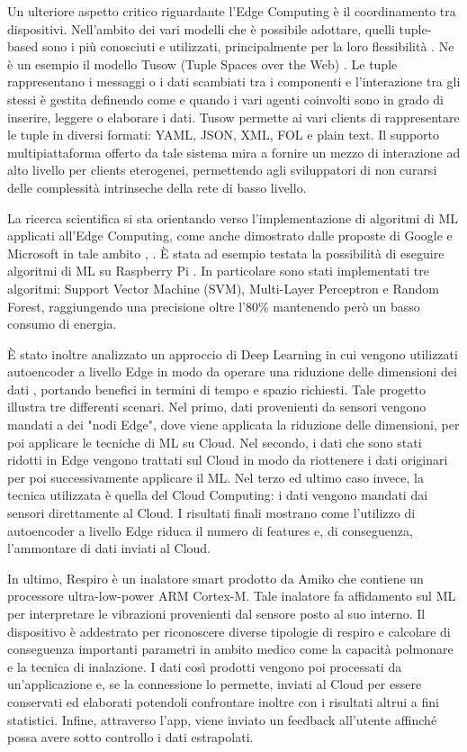 Un ulteriore aspetto critico riguardante l'Edge Computing è il coordinamento tra dispositivi. Nell'ambito dei vari modelli che è possibile adottare, quelli tuple-based sono i più conosciuti e utilizzati, principalmente per la loro flessibilità \cite{tuple}. Ne è un esempio il modello Tusow (Tuple Spaces over the Web) \cite{tusow}. Le tuple rappresentano i messaggi o i dati scambiati tra i componenti e l'interazione tra gli stessi è gestita definendo come e quando i vari agenti coinvolti sono in grado di inserire, leggere o elaborare i dati. Tusow permette ai vari clients di rappresentare le tuple in diversi formati: YAML, JSON, XML, FOL e plain text. Il supporto multipiattaforma offerto da tale sistema mira a fornire un mezzo di interazione ad alto livello per clients eterogenei, permettendo agli sviluppatori di non curarsi delle complessità intrinseche della rete di basso livello.

La ricerca scientifica si sta orientando verso l'implementazione di algoritmi di ML applicati all'Edge Computing, come anche dimostrato dalle proposte di Google e Microsoft in tale ambito \cite{tflowres}, \cite{edgemlres}.
È stata ad esempio testata la possibilità di eseguire algoritmi di ML su Raspberry Pi \cite{mlrasp}. In particolare sono stati implementati tre algoritmi: Support Vector Machine (SVM), Multi-Layer Perceptron e Random Forest, raggiungendo una precisione oltre l'80\% mantenendo però un basso consumo di energia.

È stato inoltre analizzato un approccio di Deep Learning in cui vengono utilizzati autoencoder a livello Edge in modo da operare una riduzione delle dimensioni dei dati \cite{encoder}, portando benefici in termini di tempo e spazio richiesti. Tale progetto illustra tre differenti scenari. Nel primo, dati provenienti da sensori vengono mandati a dei "nodi Edge", dove viene applicata la riduzione delle dimensioni, per poi applicare le tecniche di ML su Cloud. Nel secondo, i dati che sono stati ridotti in Edge vengono trattati sul Cloud in modo da riottenere i dati originari per poi successivamente applicare il ML. Nel terzo ed ultimo caso invece, la tecnica utilizzata è quella del Cloud Computing: i dati vengono mandati dai sensori direttamente al Cloud. I risultati finali mostrano come l'utilizzo di autoencoder a livello Edge riduca il numero di features e, di conseguenza, l'ammontare di dati inviati al Cloud.

In ultimo, Respiro è un inalatore smart prodotto da Amiko \cite{respiro} che contiene un processore ultra-low-power ARM Cortex-M. Tale inalatore fa affidamento sul ML per interpretare le vibrazioni provenienti dal sensore posto al suo interno. Il dispositivo è addestrato per riconoscere diverse tipologie di respiro e calcolare di conseguenza importanti parametri in ambito medico come la capacità polmonare e la tecnica di inalazione. I dati così prodotti vengono poi processati da un'applicazione e, se la connessione lo permette, inviati al Cloud per essere conservati ed elaborati potendoli confrontare inoltre con i risultati altrui a fini statistici. Infine, attraverso l'app, viene inviato un feedback all'utente affinché possa avere sotto controllo i dati estrapolati.

